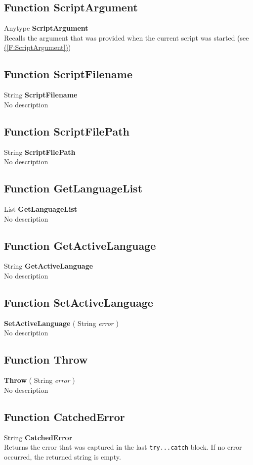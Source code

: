 \documentclass[10pt]{book}
\newcommand{\linkitem}[1]{\hyperref[#1]{\nameref{#1} (\ref{#1})}}
\newcommand{\sourcecode}[1]{\texttt{#1}}
\begin{document}
\subsection{Function ScriptArgument \label{F:ScriptArgument}}
Anytype \textbf{ScriptArgument} \\
Recalls the argument that was provided when the current script was started (see \linkitem{F:ScriptArgument})

\subsection{Function ScriptFilename \label{F:ScriptFilename}}
String \textbf{ScriptFilename} \\
No description

\subsection{Function ScriptFilePath \label{F:ScriptFilePath}}
String \textbf{ScriptFilePath} \\
No description

\subsection{Function GetLanguageList \label{F:GetLanguageList}}
List \textbf{GetLanguageList} \\
No description

\subsection{Function GetActiveLanguage \label{F:GetActiveLanguage}}
String \textbf{GetActiveLanguage} \\
No description

\subsection{Function SetActiveLanguage \label{F:SetActiveLanguage}}
\textbf{SetActiveLanguage} ( String \textit{error} ) \\
No description

\subsection{Function Throw \label{F:Throw}}
\textbf{Throw} ( String \textit{error} ) \\
No description

\subsection{Function CatchedError \label{F:CatchedError}}
String \textbf{CatchedError} \\
Returns the error that was captured in the last \sourcecode{try...catch} block. If no error occurred, the returned string is empty.
\end{document}
